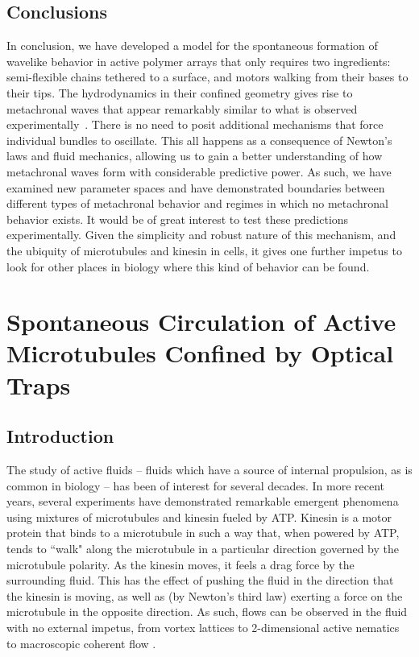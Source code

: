 \documentclass[11pt]{ucthesis}
\begin{document}
\section{Conclusions}
In conclusion,
we have developed a model for the spontaneous formation of wavelike
behavior in active polymer arrays that only requires two ingredients:
semi-flexible chains tethered to a surface, and motors walking from
their bases to their tips. The hydrodynamics in their confined
geometry gives rise to metachronal waves that appear remarkably
similar to what is observed experimentally~\cite{Sanchez2011,sanchez2013engineering}.
There is no need to posit additional mechanisms that force
individual bundles to oscillate. This all happens as a consequence of Newton's
laws and fluid mechanics, allowing us to
gain a better understanding of how metachronal waves form with
considerable predictive power. As such, we have examined new parameter spaces and have
demonstrated boundaries between different types of metachronal
behavior and regimes in which no metachronal behavior exists.
It would be of great interest to test these predictions
experimentally.
Given the simplicity and robust nature of this mechanism, 
and the ubiquity of microtubules and kinesin in cells, it
gives one further impetus to look for other places in biology
where this kind of behavior can be found.


\chapter{Spontaneous Circulation of Active Microtubules Confined by Optical Traps}
\label{chap:opt_trap}

\section{Introduction}

The study of active fluids -- fluids which have a source of internal propulsion, as is common in biology -- has been of interest for several decades. In more recent years, several experiments have demonstrated remarkable emergent phenomena using mixtures of microtubules and kinesin fueled by ATP. Kinesin is a motor protein that binds to a microtubule in such a way that, when powered by ATP, tends to ``walk" along the microtubule in a particular direction governed by the microtubule polarity. As the kinesin moves, it feels a drag force by the surrounding fluid. This has the effect of pushing the fluid in the direction that the kinesin is moving, as well as (by Newton's third law) exerting a force on the microtubule in the opposite direction. As such, flows can be observed in the fluid with no external impetus, from vortex lattices \cite{sumino2012large} to 2-dimensional active nematics \cite{sanchez2012spontaneous,decamp2015orientational} to macroscopic coherent flow \cite{wu2017transition}.
\end{document}
